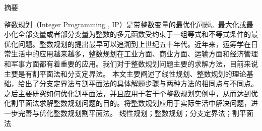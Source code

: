 \documentclass[
	StudentName     = 杨晓宇,
	StudentID       = 1922105012,
	AdvisorName     = 王俊,
	Major           = 信息与计算科学,
	Department      = 理学院,
	SubmitYear		= 2023,
	SubmitMonth		= 6,
	Title           = 加速割平面法的技巧探究,
	TitleEng        = {{Accelerate the exploration of the techniques of the cut plane method}}
]{just_thesis}
\newcommand{\inputpage}[1]{
	
}
\begin{document}
	\inputpage{cover}
	
	\newpage
	\setcounter{page}{1}
	\setlength{\headsep}{1.224cm}
	\begin{center}
		\fakehei 摘\quad 要
	\end{center}
	\vspace{21pt}
	
	
	\setlength{\baselineskip}{20pt}
	整数规划（Integer Programming , IP）是带整数变量的最优化问题。最大化或最小化全部变量或者部分变量为整数的多元函数受约束于一组等式和不等式条件的最优化问题。整数规划的提出最早可以追溯到上世纪五十年代。近年来，运筹学在日常生活中的应用越来越多，整数规划在工业方面、商业方面、运输方面和经济管理和军事方面都有着重要的应用。我们对于整数规划问题主要的求解方法，目前来说主要是有割平面法和分支定界法。
本文主要阐述了线性规划、整数规划的理论基础，给出了分支定界法与割平面法的具体解题步骤与两种方法的相同点与不同点。之后主要研究如何优化割平面法，并且应用于若干个整数规划实例中，从而达到优化割平面法求解整数规划问题的目的。将整数规划应用于实际生活中解决问题，进一步完善与优化整数规划割平面法。
	\newline
	\newline
	\indent{} 线性规划；整数规划；分支定界法；割平面法
\end{document}
